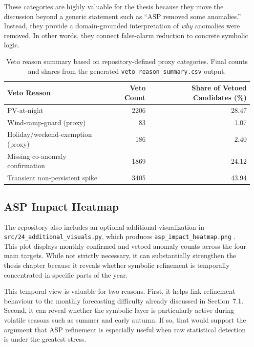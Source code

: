These categories are highly valuable for the thesis because they move the discussion
beyond a generic statement such as ``ASP removed some anomalies.'' Instead, they
provide a domain-grounded interpretation of \emph{why} anomalies were removed. In
other words, they connect false-alarm reduction to concrete symbolic logic.


\FloatBarrier
\begin{table}[htbp]
	\centering
	\caption{Veto reason summary based on repository-defined proxy categories. Final counts and shares from the generated \texttt{veto\_reason\_summary.csv} output.}
	\label{tab:veto_reason_summary_ch72}
	\small
	\begin{tabular}{|p{4.2cm}|r|r|}
		\hline
		\textbf{Veto Reason} & \textbf{Veto Count} & \textbf{Share of Vetoed Candidates (\%)} \\
		\hline
		PV-at-night & 2206 & 28.47 \\
		Wind-ramp-guard (proxy) & 83 & 1.07 \\
		Holiday/weekend-exemption (proxy) & 186 & 2.40 \\
		Missing co-anomaly confirmation & 1869 & 24.12 \\
		Transient non-persistent spike & 3405 & 43.94 \\
		\hline
	\end{tabular}
\end{table}
\FloatBarrier


\subsection{ASP Impact Heatmap}

The repository also includes an optional additional visualization in \texttt{src/24\_additional\_visuals.py}, which produces \texttt{asp\_impact\_heatmap.png} \cite{repo_thesis_grid_anomaly}. This plot displays monthly confirmed and vetoed anomaly counts across the four main targets. While not strictly necessary, it can substantially strengthen the thesis chapter because it reveals whether symbolic refinement is temporally concentrated in specific parts of the year.

This temporal view is valuable for two reasons. First, it helps link refinement behaviour to the monthly forecasting difficulty already discussed in Section~7.1. Second, it can reveal whether the symbolic layer is particularly active during volatile seasons such as summer and early autumn. If so, that would support the argument that ASP refinement is especially useful when raw statistical detection is under the greatest stress.

